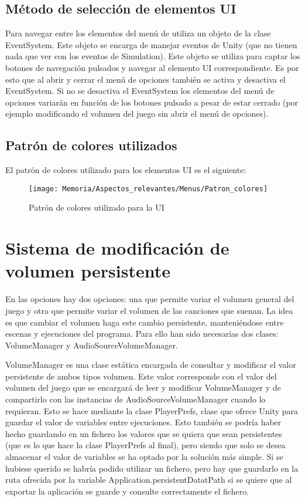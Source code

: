 \subsection{Método de selección de elementos UI}
Para navegar entre los elementos del menú de utiliza un objeto de la clase EventSystem. Este objeto se encarga de manejar eventos de Unity (que no tienen nada que ver con los eventos de Simulation). Este objeto se utiliza para captar los botones de navegación pulsados y navegar al elemento UI correspondiente. Es por esto que al abrir y cerrar el menú de opciones también se activa y desactiva el EventSystem. Si no se desactiva el EventSystem los elementos del menú de opciones variarán en función de los botones pulsado a pesar de estar cerrado (por ejemplo modificando el volumen del juego sin abrir el menú de opciones). 

\subsection{Patrón de colores utilizados}
El patrón de colores utilizado para los elementos UI es el siguiente:

\clearpage
\begin{figure}[h]
\texttt{[image: Memoria/Aspectos\_relevantes/Menus/Patron\_colores]}
\caption{Patrón de colores utilizado para la UI}
\end{figure}

\section{Sistema de modificación de volumen persistente}
En las opciones hay dos opciones: una que permite variar el volumen general del juego y otra que permite variar el volumen de las canciones que suenan. La idea es que cambiar el volumen haga este cambio persistente, manteniéndose entre escenas y ejecuciones del programa. Para ello han sido necesarias dos clases: VolumeManager y AudioSourceVolumeManager.

VolumeManager es una clase estática encargada de consultar y modificar el valor persistente de ambos tipos volumen. Este valor corresponde con el valor del volumen del juego que se encargará de leer y modificar VolumeManager y de compartirlo con las instancias de AudioSourceVolumeManager cuando lo requieran. Esto se hace mediante la clase PlayerPrefs, clase que ofrece Unity para guardar el valor de variables entre ejecuciones. Esto también se podría haber hecho guardando en un fichero los valores que se quiera que sean persistentes (que es lo que hace la clase PlayerPrefs al final), pero siendo que solo se desea almacenar el valor de variables se ha optado por la solución más simple. Si se hubiese querido se habría podido utilizar un fichero, pero hay que guardarlo en la ruta ofrecida por la variable Application.persistentDatatPath si se quiere que al exportar la aplicación se guarde y consulte correctamente el fichero.

